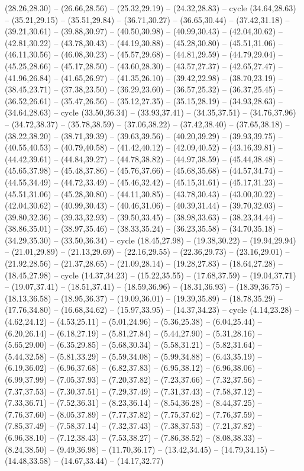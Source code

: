 {(28.26,28.30) -- (26.66,28.56) -- (25.32,29.19) -- (24.32,28.83) -- cycle (34.64,28.63) -- (35.21,29.15) -- (35.51,29.84) -- (36.71,30.27) -- (36.65,30.44) -- (37.42,31.18) -- (39.21,30.61) -- (39.88,30.97) -- (40.50,30.98) -- (40.99,30.43) -- (42.04,30.62) -- (42.81,30.22) -- (43.78,30.43) -- (44.19,30.88) -- (45.28,30.80) -- (45.51,31.06) -- (46.11,30.56) -- (46.08,30.23) -- (45.57,29.68) -- (44.81,29.59) -- (44.79,29.04) -- (45.25,28.66) -- (45.17,28.50) -- (43.60,28.30) -- (43.57,27.37) -- (42.65,27.47) -- (41.96,26.84) -- (41.65,26.97) -- (41.35,26.10) -- (39.42,22.98) -- (38.70,23.19) -- (38.45,23.71) -- (37.38,23.50) -- (36.29,23.60) -- (36.57,25.32) -- (36.37,25.45) -- (36.52,26.61) -- (35.47,26.56) -- (35.12,27.35) -- (35.15,28.19) -- (34.93,28.63) -- (34.64,28.63) -- cycle (33.50,36.34) -- (33.93,37.41) -- (34.35,37.51) -- (34.76,37.96) -- (34.72,38.37) -- (35.78,38.59) -- (37.06,38.22) -- (37.42,38.40) -- (37.65,38.18) -- (38.22,38.20) -- (38.71,39.39) -- (39.63,39.56) -- (40.20,39.29) -- (39.93,39.75) -- (40.55,40.53) -- (40.79,40.58) -- (41.42,40.12) -- (42.09,40.52) -- (43.16,39.81) -- (44.42,39.61) -- (44.84,39.27) -- (44.78,38.82) -- (44.97,38.59) -- (45.44,38.48) -- (45.65,37.98) -- (45.48,37.86) -- (45.76,37.66) -- (45.68,35.68) -- (44.57,34.74) -- (44.55,34.49) -- (44.72,33.49) -- (45.46,32.42) -- (45.15,31.61) -- (45.17,31.23) -- (45.51,31.06) -- (45.28,30.80) -- (44.11,30.85) -- (43.78,30.43) -- (43.00,30.22) -- (42.04,30.62) -- (40.99,30.43) -- (40.46,31.06) -- (40.39,31.44) -- (39.70,32.03) -- (39.80,32.36) -- (39.33,32.93) -- (39.50,33.45) -- (38.98,33.63) -- (38.23,34.44) -- (38.86,35.01) -- (38.97,35.46) -- (38.33,35.24) -- (36.23,35.58) -- (34.70,35.18) -- (34.29,35.30) -- (33.50,36.34) -- cycle (18.45,27.98) -- (19.38,30.22) -- (19.94,29.94) -- (21.01,29.89) -- (21.13,29.69) -- (22.16,29.55) -- (22.36,29.73) -- (23.16,29.01) -- (21.92,28.56) -- (21.37,28.65) -- (21.09,28.14) -- (19.28,27.83) -- (18.64,27.28) -- (18.45,27.98) -- cycle (14.37,34.23) -- (15.22,35.55) -- (17.68,37.59) -- (19.04,37.71) -- (19.07,37.41) -- (18.51,37.41) -- (18.59,36.96) -- (18.31,36.93) -- (18.39,36.75) -- (18.13,36.58) -- (18.95,36.37) -- (19.09,36.01) -- (19.39,35.89) -- (18.78,35.29) -- (17.76,34.80) -- (16.68,34.62) -- (15.97,33.95) -- (14.37,34.23) -- cycle (4.14,23.28) -- (4.62,24.12) -- (4.53,25.11) -- (5.01,24.96) -- (5.36,25.38) -- (6.04,25.44) -- (6.20,26.14) -- (6.18,27.19) -- (5.81,27.84) -- (5.44,27.90) -- (5.31,28.16) -- (5.65,29.00) -- (6.35,29.85) -- (5.68,30.34) -- (5.58,31.21) -- (5.82,31.64) -- (5.44,32.58) -- (5.81,33.29) -- (5.59,34.08) -- (5.99,34.88) -- (6.43,35.19) -- (6.19,36.02) -- (6.96,37.68) -- (6.82,37.83) -- (6.95,38.12) -- (6.96,38.06) -- (6.99,37.99) -- (7.05,37.93) -- (7.20,37.82) -- (7.23,37.66) -- (7.32,37.56) -- (7.37,37.53) -- (7.30,37.51) -- (7.29,37.49) -- (7.31,37.43) -- (7.58,37.12) -- (7.33,36.71) -- (7.52,36.31) -- (8.23,36.14) -- (8.54,36.28) -- (8.44,37.25) -- (7.76,37.60) -- (8.05,37.89) -- (7.77,37.82) -- (7.75,37.62) -- (7.76,37.59) -- (7.85,37.49) -- (7.58,37.14) -- (7.32,37.43) -- (7.38,37.53) -- (7.21,37.82) -- (6.96,38.10) -- (7.12,38.43) -- (7.53,38.27) -- (7.86,38.52) -- (8.08,38.33) -- (8.24,38.50) -- (9.49,36.98) -- (11.70,36.17) -- (13.42,34.45) -- (14.79,34.15) -- (14.48,33.58) -- (14.67,33.44) -- (14.17,32.77) }
